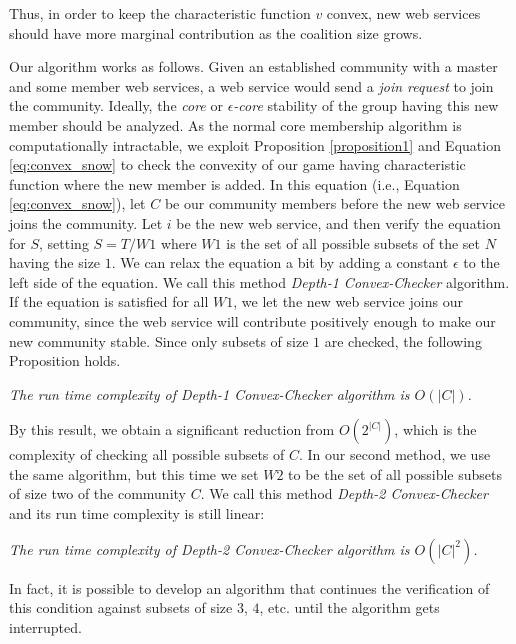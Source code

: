 \documentclass[10pt,journal,cspaper,compsoc]{IEEEtran}
\begin{document}
Thus, in order to keep the characteristic function $v$ convex, new
web services should have more marginal contribution as the
coalition size grows.

Our algorithm works as follows. Given an  established community
with a master and some member web services, a web service would
send a \emph{join request} to join  the community. Ideally, the
\emph{core} or \emph{$\epsilon$-core} stability of the group
having this new member should be analyzed. As the normal core
membership algorithm is computationally intractable, we exploit
Proposition \ref{proposition1} and Equation \ref{eq:convex_snow}
to check the convexity of our game having characteristic function
where the new member is added. In this equation (i.e., Equation
\ref{eq:convex_snow}), let $C$ be our community members before the
new web service joins the community. Let  ${i}$ be the new web
service, and then verify the equation for $S$, setting $ S = T /
W1 $ where $W1$ is the set of all possible subsets of the set $N$
having the size $1$. We can relax the equation a bit by adding a
constant $\epsilon$ to the left side of the equation. We call this
method \emph{Depth-1 Convex-Checker} algorithm. If the equation is
satisfied for all $W1$, we let the new web service joins our
community, since the web service will contribute positively enough
to make our new community stable. Since only subsets of size $1$
are checked, the following Proposition holds.

\begin{theorem}\label{complexity1}
\emph{The run time complexity of Depth-1 Convex-Checker algorithm
is $O(|C|)$.}
\end{theorem}

By this result, we obtain a significant reduction from
$O(2^{|C|})$, which is the complexity of checking all possible
subsets of $C$. In our second method, we use the same algorithm,
but this time we set $W2$ to be the set of all possible subsets of
size two of the community $C$. We call this method \emph{Depth-2
Convex-Checker} and its run time complexity is still linear:

\begin{theorem}\label{complexity2}
\emph{The run time complexity of Depth-2 Convex-Checker algorithm
is $O(|C|^2)$.}
\end{theorem}

In fact, it is possible to develop an algorithm that continues the
verification of this condition against subsets of size $3$, $4$,
etc. until the algorithm gets interrupted.
\end{document}
